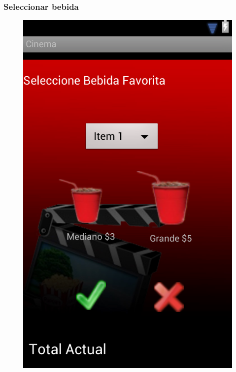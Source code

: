 \documentclass{beamer}
\begin{document}
\begin{frame}[allowframbreaks]
\frametitle{Seleccionar bebida}
\begin{figure}[h]
\centering
\includegraphics[height=0.8\textheight]{bebidas.png}
\end{figure}
\end{frame}
\end{document}

